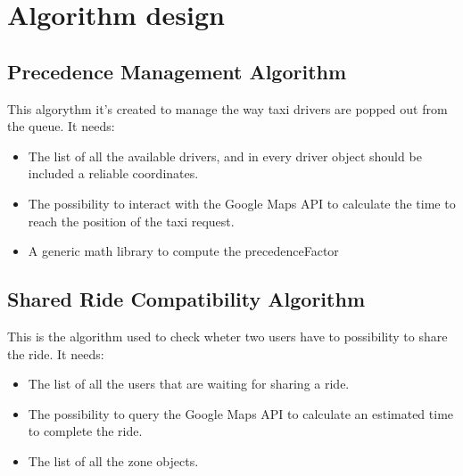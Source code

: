 

\section{Algorithm design} %
\label{sec:algorithm_design}


\subsection{Precedence Management Algorithm} %
\label{sub:first_algorithm}
This algorythm it's created to manage the way taxi drivers are popped out from the queue.
It needs:

\begin{itemize}
	\item The list of all the available drivers, and in every driver object should be included a reliable coordinates.
	\item The possibility to interact with the Google Maps API to calculate the time to reach the position of the taxi request.
	\item A generic math library to compute the precedenceFactor
\end{itemize}







\subsection{Shared Ride Compatibility Algorithm} %
\label{sub:second_algorithm}
This is the algorithm used to check wheter two users have to possibility to share the ride.
It needs:
\begin{itemize}
	\item The list of all the users that are waiting for sharing a ride.
	\item The possibility to query the Google Maps API to calculate an estimated time to complete the ride.
	\item The list of all the zone objects.
\end{itemize}

